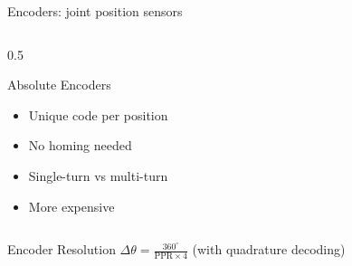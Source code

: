\documentclass[10pt]{beamer}
\begin{document}
\begin{frame}{Encoders: joint position sensors}
\begin{columns}
        \begin{column}{0.5\textwidth}
            \begin{block}{Absolute Encoders}
                \begin{center}
                \end{center}
                \begin{itemize}
                    \footnotesize
                    \item Unique code per position
                    \item No homing needed
                    \item Single-turn vs multi-turn
                    \item More expensive
                \end{itemize}
            \end{block}
        \end{column}
    \end{columns}
    
    \begin{alertblock}{Encoder Resolution}
        $\Delta\theta = \frac{360^\circ}{\text{PPR} \times 4}$ (with quadrature decoding)
    \end{alertblock}
\end{frame}
\end{document}
